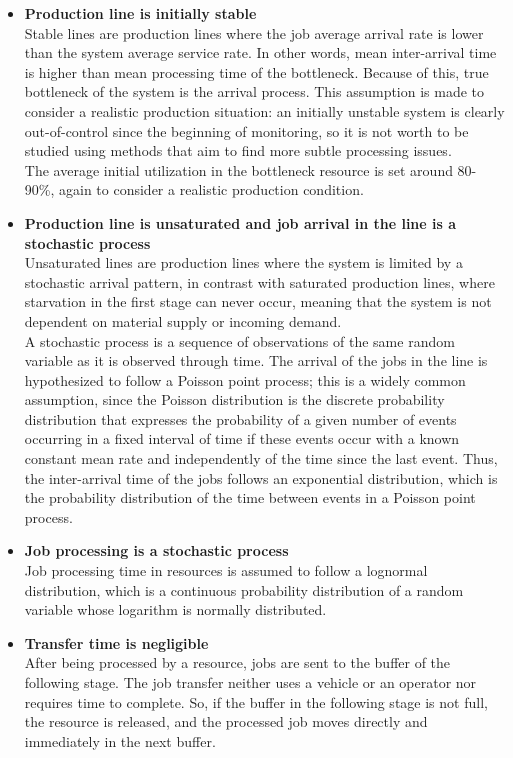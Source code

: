 \begin{itemize}
\item \textbf{Production line is initially stable}\\
Stable lines are production lines where the job average arrival rate is lower than the system average service rate. In other words, mean inter-arrival time is higher than mean processing time of the bottleneck. Because of this, true bottleneck of the system is the arrival process. This assumption is made to consider a realistic production situation: an initially unstable system is clearly out-of-control since the beginning of monitoring, so it is not worth to be studied using methods that aim to find more subtle processing issues.\\
The average initial utilization in the bottleneck resource is set around 80-90\%, again to consider a realistic production condition.
\item \textbf{Production line is unsaturated and job arrival in the line is a stochastic process}\\
Unsaturated lines are production lines where the system is limited by a stochastic arrival pattern, in contrast with saturated production lines, where starvation in the first stage can never occur, meaning that the system is not dependent on material supply or incoming demand. \\
A stochastic process is a sequence of observations of the same random variable as it is observed through time. The arrival of the jobs in the line is hypothesized to follow a Poisson point process; this is a widely common assumption, since the Poisson distribution is the discrete probability distribution that expresses the probability of a given number of events occurring in a fixed interval of time if these events occur with a known constant mean rate and independently of the time since the last event. Thus, the inter-arrival time of the jobs follows an exponential distribution, which is the probability distribution of the time between events in a Poisson point process.
\item \textbf{Job processing is a stochastic process}\\
Job processing time in resources is assumed to follow a lognormal distribution, which is a continuous probability distribution of a random variable whose logarithm is normally distributed.
\item \textbf{Transfer time is negligible}\\
After being processed by a resource, jobs are sent to the buffer of the following stage. The job transfer neither uses a vehicle or an operator nor requires time to complete. So, if the buffer in the following stage is not full, the resource is released, and the processed job moves directly and immediately in the next buffer.

\end{itemize}

